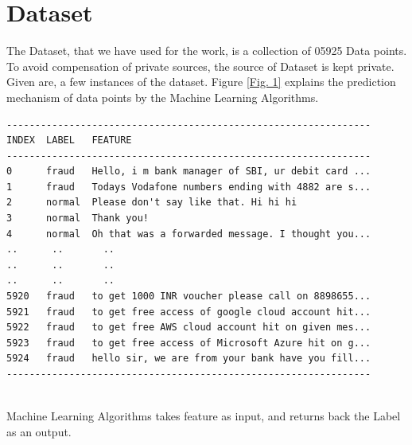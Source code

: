 \documentclass[sn-mathphys]{sn-jnl}%
\theoremstyle{thmstyleone}%
\theoremstyle{thmstyletwo}%
\theoremstyle{thmstylethree}%
\begin{document}
\section{Dataset}
The Dataset, that we have used for the work, is a collection of 05925 Data points. To avoid compensation of private sources, the source of Dataset is kept private. Given are, a few instances of the dataset. Figure \ref{Fig. 1} explains the prediction mechanism of data points by the Machine Learning Algorithms. \\
\begin{verbatim}
----------------------------------------------------------------
INDEX  LABEL   FEATURE
----------------------------------------------------------------
0      fraud   Hello, i m bank manager of SBI, ur debit card ...
1      fraud   Todays Vodafone numbers ending with 4882 are s...
2      normal  Please don't say like that. Hi hi hi
3      normal  Thank you!
4      normal  Oh that was a forwarded message. I thought you...
..      ..       ..
..      ..       ..
..      ..       ..
5920   fraud   to get 1000 INR voucher please call on 8898655...
5921   fraud   to get free access of google cloud account hit...
5922   fraud   to get free AWS cloud account hit on given mes...
5923   fraud   to get free access of Microsoft Azure hit on g...
5924   fraud   hello sir, we are from your bank have you fill...
----------------------------------------------------------------
\end{verbatim}
\textbf{\\}Machine Learning Algorithms takes feature as input, and returns back the Label as an output. 
\end{document}
